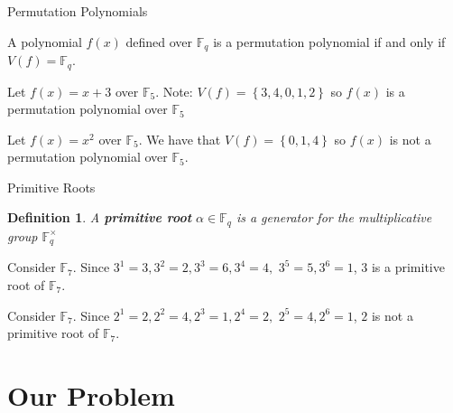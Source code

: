 \documentclass{beamer}
\newtheorem*{definition*}{Definition}
\begin{document}
\begin{frame}{Permutation Polynomials}

\begin{definition}
  A polynomial $f(x)$ defined over $\mathbb{F}_{q}$ is a permutation polynomial if and only if  $V(f) = \mathbb{F}_{q}$.
\end{definition}

\pause

\begin{example}
  Let $f(x) = x+3$ over $\mathbb{F}_{5}$. Note: $V(f) = \left\{3, 4, 0, 1, 2 \right\}$ so $f(x)$ is a permutation polynomial over $\mathbb{F}_{5}$
\end{example}

\pause

\begin{example}
Let $f(x) = x^2$ over $\mathbb{F}_{5}$. We have that $V(f) = \left\{0, 1, 4 \right\}$ so $f(x)$ is not a permutation polynomial over $\mathbb{F}_{5}$.
\end{example}

\end{frame}


\begin{frame}{Primitive Roots}

\begin{definition*}
  A \textbf{primitive root} $\alpha \in \mathbb{F}_q$ is a generator for the multiplicative group $\mathbb{F}_{q}^{\times}$
\end{definition*}

\pause

\begin{example}
  Consider $\mathbb{F}_{7}$. Since $3^1 = 3, 3^2 = 2, 3^3 = 6, 3^4 = 4,$ $ 3^5 = 5, 3^6 = 1$, $3$ is a primitive root of $\mathbb{F}_{7}$.
\end{example}

\pause

\begin{example}
  Consider $\mathbb{F}_{7}$. Since $2^1 = 2, 2^2 = 4, 2^3 = 1, 2^4 = 2,$ $ 2^5 = 4, 2^6 = 1$, $2$ is not a primitive root of $\mathbb{F}_{7}$.
\end{example}

\end{frame}


\section{Our Problem} %
\label{sec:our_problem}
\end{document}
